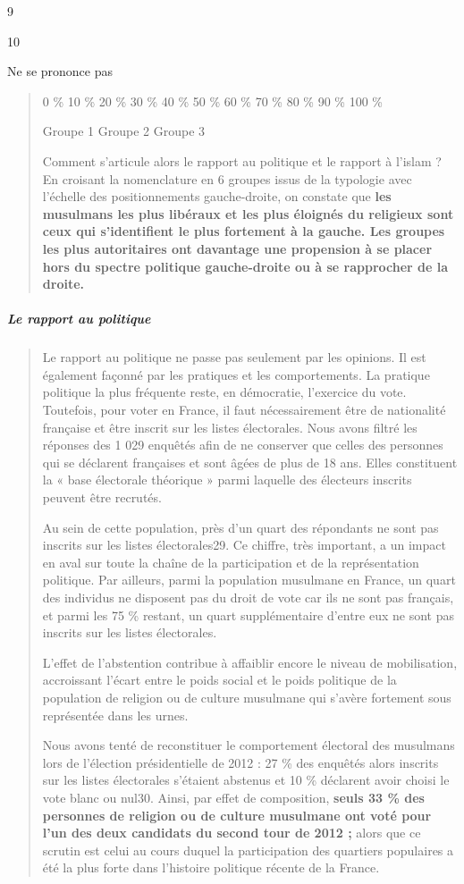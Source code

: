 9

10

Ne se prononce pas

\begin{quote}
0 \% 10 \% 20 \% 30 \% 40 \% 50 \% 60 \% 70 \% 80 \% 90 \% 100 \%

Groupe 1 Groupe 2 Groupe 3

Comment s'articule alors le rapport au politique et le rapport à l'islam
? En croisant la nomenclature en 6 groupes issus de la typologie avec
l'échelle des positionnements gauche-droite, on constate que \textbf{les
musulmans les plus libéraux et les plus éloignés du religieux sont ceux
qui s'identifient le plus fortement à la gauche. Les groupes les plus
autoritaires ont davantage une propension à se placer hors du spectre
politique gauche-droite ou à se rapprocher de la droite.}
\end{quote}

\hypertarget{le-rapport-au-politique}{%
\subparagraph{Le rapport au politique}\label{le-rapport-au-politique}}

\begin{quote}
Le rapport au politique ne passe pas seulement par les opinions. Il est
également façonné par les pratiques et les comportements. La pratique
politique la plus fréquente reste, en démocratie, l'exercice du vote.
Toutefois, pour voter en France, il faut nécessairement être de
nationalité française et être inscrit sur les listes électorales. Nous
avons filtré les réponses des 1 029 enquêtés afin de ne conserver que
celles des personnes qui se déclarent françaises et sont âgées de plus
de 18 ans. Elles constituent la « base électorale théorique » parmi
laquelle des électeurs inscrits peuvent être recrutés.



Au sein de cette population, près d'un quart des répondants ne sont pas
inscrits sur les listes électorales29. Ce chiffre, très important, a un
impact en aval sur toute la chaîne de la participation et de la
représentation politique. Par ailleurs, parmi la population musulmane en
France, un quart des individus ne disposent pas du droit de vote car ils
ne sont pas français, et parmi les 75 \% restant, un quart
supplémentaire d'entre eux ne sont pas inscrits sur les listes
électorales.

L'effet de l'abstention contribue à affaiblir encore le niveau de
mobilisation, accroissant l'écart entre le poids social et le poids
politique de la population de religion ou de culture musulmane qui
s'avère fortement sous représentée dans les urnes.

Nous avons tenté de reconstituer le comportement électoral des musulmans
lors de l'élection présidentielle de 2012 : 27 \% des enquêtés alors
inscrits sur les listes électorales s'étaient abstenus et 10 \%
déclarent avoir choisi le vote blanc ou nul30. Ainsi, par effet de
composition, \textbf{seuls 33 \% des personnes de religion ou de culture
musulmane ont voté pour l'un des deux candidats du second tour de 2012
;} alors que ce scrutin est celui au cours duquel la participation des
quartiers populaires a été la plus forte dans l'histoire politique
récente de la France.
\end{quote}

